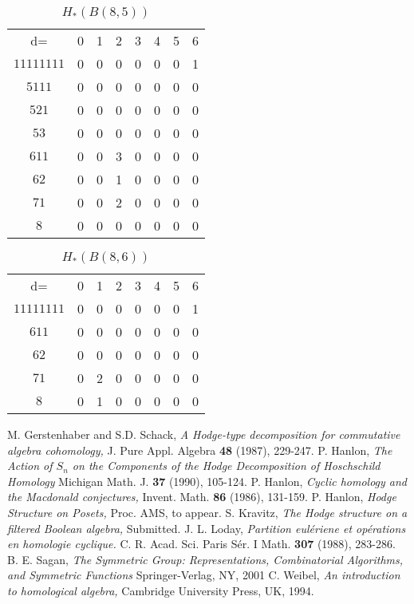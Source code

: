 \documentclass{elsart}
\begin{document}
\begin{table}
\begin{tabular}{cccccccc}
d= & 0 & 1 & 2 & 3 & 4 & 5 & 6  \\
$11111111$ & 0 & 0 & 0 & 0 & 0 & 0 & 1  \\
$5111$     & 0 & 0 & 0 & 0 & 0 & 0 & 0  \\
$521$      & 0 & 0 & 0 & 0 & 0 & 0 & 0  \\
$53$       & 0 & 0 & 0 & 0 & 0 & 0 & 0  \\
$611$      & 0 & 0 & 3 & 0 & 0 & 0 & 0  \\
$62$       & 0 & 0 & 1 & 0 & 0 & 0 & 0  \\
$71$       & 0 & 0 & 2 & 0 & 0 & 0 & 0  \\
$8$        & 0 & 0 & 0 & 0 & 0 & 0 & 0  \\
\end{tabular}
\caption[$H_*(B(8,5))$]{$H_*(B(8, 5))$}
\label{T:8_5}
\end{table}

\begin{table}
\begin{tabular}{cccccccc}
d= & 0 & 1 & 2 & 3 & 4 & 5 & 6  \\
$11111111$ & 0 & 0 & 0 & 0 & 0 & 0 & 1  \\
$611$      & 0 & 0 & 0 & 0 & 0 & 0 & 0  \\
$62$       & 0 & 0 & 0 & 0 & 0 & 0 & 0  \\
$71$       & 0 & 2 & 0 & 0 & 0 & 0 & 0  \\
$8$        & 0 & 1 & 0 & 0 & 0 & 0 & 0  \\
\end{tabular}
\caption[$H_*(B(8,6))$]{$H_*(B(8, 6))$}
\label{T:8_6}
\end{table}

\begin{thebibliography}{9}
  M. Gerstenhaber and S.D. Schack,
  \emph{A Hodge-type decomposition for commutative algebra cohomology,}
  J. Pure Appl. Algebra {\bf 48} (1987), 229-247.
  P. Hanlon, 
  \emph{The Action of $S_n$ on the Components of the Hodge Decomposition of Hoschschild Homology}
  Michigan Math. J. {\bf 37} (1990), 105-124.
  P. Hanlon,
  \emph{Cyclic homology and the Macdonald conjectures,}
  Invent. Math. {\bf 86} (1986), 131-159.
  P. Hanlon,
  \emph{Hodge Structure on Posets,}
  Proc. AMS, to appear.
  S. Kravitz,
  \emph{The Hodge structure on a filtered Boolean algebra,}
  Submitted.
  J. L. Loday,
  \emph{Partition eul\'eriene et op\'erations en homologie cyclique.}
  C. R. Acad. Sci. Paris S\'er. I Math. {\bf 307} (1988), 283-286.
  B. E. Sagan,
  \emph{The Symmetric Group: Representations, Combinatorial Algorithms, and Symmetric Functions}
  Springer-Verlag, NY, 2001
  C. Weibel,
  \emph{An introduction to homological algebra,}
  Cambridge University Press, UK, 1994.

\end{thebibliography}
\end{document}
